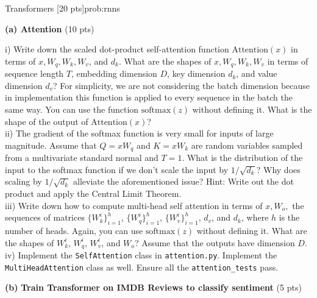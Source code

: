 
\begin{problem}{Transformers \hfill [20 pts]}{prob:rnns}
\label{prob:rnns}

\begin{adjustwidth}{2em}{2em}
    
    \textbf{(a) Attention } \hfill (10 pts) 
    
    \begin{adjustwidth}{2em}{2em}
    i) Write down the scaled dot-product self-attention function $\text{Attention}(x)$ in terms of $x, W_q, W_k, W_v$, and $d_k$. What are the shapes of $x, W_q, W_k, W_v$ in terms of sequence length $T$, embedding dimension $D$, key dimension $d_k$, and value dimension $d_v$? For simplicity, we are not considering the batch dimension because in implementation this function is applied to every sequence in the batch the same way. You can use the function $\text{softmax}(z)$ without defining it. What is the shape of the output of $\text{Attention}(x)$?
    \\

    ii) The gradient of the softmax function is very small for inputs of large magnitude. Assume that $Q = xW_q$ and $K = xW_k$ are random variables sampled from a multivariate standard normal and $T = 1$. What is the distribution of the input to the softmax function if we don't scale the input by $1/\sqrt{d_k}$? Why does scaling by $1/\sqrt{d_k}$ alleviate the aforementioned issue? Hint: Write out the dot product and apply the Central Limit Theorem.
    \\

    iii) Write down how to compute multi-head self attention in terms of $x, W_o,$ the sequences of matrices $\{W_k^i\}_{i = 1}^h$, $\{W_q^i\}_{i = 1}^h$, $\{W_v^i\}_{i = 1}^h$, $d_v$, and $d_k$, where $h$ is the number of heads. Again, you can use $\text{softmax}(z)$ without defining it. What are the shapes of $W_k^i$, $W_q^i $, $W_v^i$, and $W_o$? Assume that the outputs have dimension $D$.
\\

    iv) Implement the \texttt{SelfAttention} class in \texttt{attention.py}. Implement the \texttt{MultiHeadAttention} class as well. Ensure all the \texttt{attention\_tests} pass. 

    \end{adjustwidth} 
    \vspace{5px}

    
    \textbf{(b)} \textbf{Train Transformer on IMDB Reviews to classify sentiment} \hfill (5 pts)
    \begin{adjustwidth}{2em}{2em}


\end{adjustwidth}
\end{adjustwidth}
\end{problem}
